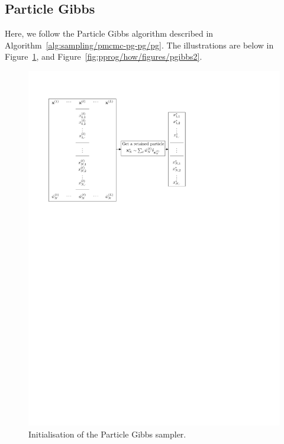 \subsection{Particle Gibbs}
Here, we follow the Particle Gibbs algorithm described in Algorithm~\ref{alg:sampling/pmcmc-pg-pg/pg}. The illustrations are below in Figure~\ref{fig:pprog/how/figures/pgibbs1}, and Figure~\ref{fig:pprog/how/figures/pgibbs2}.
\begin{figure}[!htb]
\centering
\includegraphics[scale=0.75]{pprog/how/figures/pgibbs/pgibbs1}
\caption{Initialisation of the Particle Gibbs sampler.}
\label{fig:pprog/how/figures/pgibbs1}
\end{figure}

